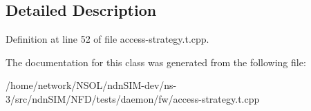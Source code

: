 \subsection{Detailed Description}


Definition at line 52 of file access-\/strategy.\+t.\+cpp.



The documentation for this class was generated from the following file\+:\begin{DoxyCompactItemize}
\item 
/home/network/\+N\+S\+O\+L/ndn\+S\+I\+M-\/dev/ns-\/3/src/ndn\+S\+I\+M/\+N\+F\+D/tests/daemon/fw/access-\/strategy.\+t.\+cpp\end{DoxyCompactItemize}
